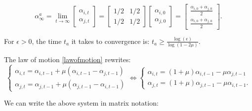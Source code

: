 \documentclass{article}
\begin{document}
\[
\alpha_{\infty}^{a} = \lim_{t \rightarrow \infty} 
 \begin{bmatrix}
\alpha_{i,t} \\
\alpha_{j,t}
 \end{bmatrix}
=
 \begin{bmatrix} 
1/2 & 1/2    \\
1/2  & 1/2  \end{bmatrix} 
 \begin{bmatrix} 
\alpha_{i,0}  \\
\alpha_{j,0}
 \end{bmatrix}
 =
  \begin{bmatrix} 
\frac{\alpha_{i,0} + \alpha_{j,0}}{2}  \\
\frac{\alpha_{i,0} + \alpha_{j,0}}{2} 
 \end{bmatrix}.
  \] 

\noindent For $\epsilon >0$, the time $t_a$ it takes to convergence is:
$t_a \geq \frac{\log(\epsilon)}{\log(1-2\mu)}$.
 
 \bigskip
 
 The law of motion \eqref{lawofmotion} rewrites:
\begin{equation*}
	\begin{cases}
		\alpha_{i,t} = \alpha_{i,t-1} + \mu (\alpha_{i,t-1} - \alpha_{j,t-1}) \\
		\alpha_{j,t} = \alpha_{j,t-1} + \mu (\alpha_{j,t-1} - \alpha_{i,t-1})
	\end{cases}
\Leftrightarrow
	\begin{cases}
		\alpha_{i,t} = (1 + \mu) \alpha_{i,t-1} - \mu \alpha_{j,t-1}  \\
		\alpha_{j,t} = (1 + \mu) \alpha_{j,t-1} - \mu \alpha_{i,t-1}. 	\end{cases}
\end{equation*}

\noindent  We can write the above system in matrix notation: 
\end{document}
